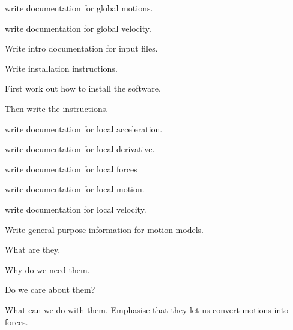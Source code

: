 \begin{DoxyRefList}
\item[\label{todo__todo000021}%
\hypertarget{todo__todo000021}{}%
Page \hyperlink{global_motion}{Global Motion} ]write documentation for global motions. 
\item[\label{todo__todo000022}%
\hypertarget{todo__todo000022}{}%
Page \hyperlink{global_velocity}{Global Velocity} ]write documentation for global velocity. 
\item[\label{todo__todo000012}%
\hypertarget{todo__todo000012}{}%
Page \hyperlink{input_files}{Input Files} ]Write intro documentation for input files. 
\item[\label{todo__todo000013}%
\hypertarget{todo__todo000013}{}%
Page \hyperlink{installation_instructions}{Installation Instructions} ]Write installation instructions.
\begin{DoxyItemize}
\item First work out how to install the software.
\item Then write the instructions. 
\end{DoxyItemize}
\item[\label{todo__todo000023}%
\hypertarget{todo__todo000023}{}%
Page \hyperlink{local_acceleration}{Local Acceleration} ]write documentation for local acceleration. 
\item[\label{todo__todo000024}%
\hypertarget{todo__todo000024}{}%
Page \hyperlink{local_derivative}{Local Derivative} ]write documentation for local derivative. 
\item[\label{todo__todo000025}%
\hypertarget{todo__todo000025}{}%
Page \hyperlink{local_force}{Local Forces} ]write documentation for local forces 
\item[\label{todo__todo000026}%
\hypertarget{todo__todo000026}{}%
Page \hyperlink{local_motion}{Local Motion} ]write documentation for local motion. 
\item[\label{todo__todo000029}%
\hypertarget{todo__todo000029}{}%
Page \hyperlink{local_velocity}{Local Velocity} ]write documentation for local velocity. 
\item[\label{todo__todo000015}%
\hypertarget{todo__todo000015}{}%
Page \hyperlink{motion_model}{Motion Model} ]Write general purpose information for motion models.
\begin{DoxyItemize}
\item What are they.
\item Why do we need them.
\item Do we care about them?
\item What can we do with them. Emphasise that they let us convert motions into forces. 

\end{DoxyItemize}
\end{DoxyRefList}

